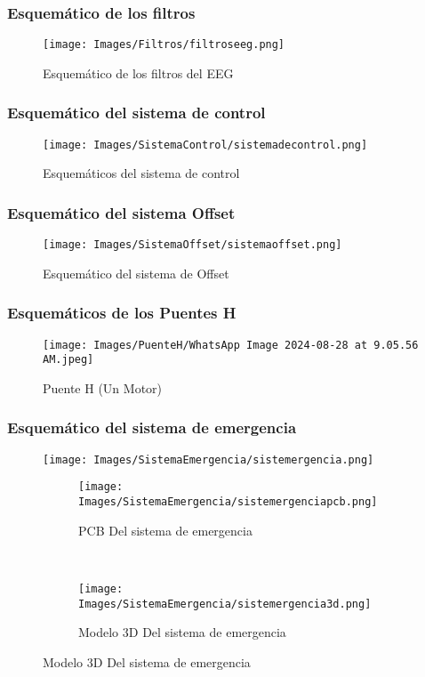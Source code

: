 \documentclass{article}
\begin{document}
\subsubsection{Esquemático de los filtros}
\begin{figure}[H]
    \centering
    \texttt{[image: Images/Filtros/filtroseeg.png]}
    \caption{Esquemático de los filtros del EEG}
\end{figure}

\subsubsection{Esquemático del sistema de control}
\begin{figure}[H]
    \centering
    \texttt{[image: Images/SistemaControl/sistemadecontrol.png]}
    \caption{Esquemáticos del sistema de control}
\end{figure}

\subsubsection{Esquemático del sistema Offset}
\begin{figure}[H]
    \centering
    \texttt{[image: Images/SistemaOffset/sistemaoffset.png]}
    \caption{Esquemático del sistema de Offset}
\end{figure}

\subsubsection{Esquemáticos de los Puentes H}
\begin{figure}[H]
    \centering
     \texttt{[image: Images/PuenteH/WhatsApp Image 2024-08-28 at 9.05.56 AM.jpeg]}
    \caption{Puente H (Un Motor)}
\end{figure}

\subsubsection{Esquemático del sistema de emergencia}
\begin{figure}[H]
    \centering
    \texttt{[image: Images/SistemaEmergencia/sistemergencia.png]}
    \caption{Esquemático del sistema de emegencia}


    \begin{subfigure}[t]{0.5\textwidth}
        \centering
        \texttt{[image: Images/SistemaEmergencia/sistemergenciapcb.png]}
        \caption{PCB Del sistema de emergencia}
    \end{subfigure}%
    ~ 
    \begin{subfigure}[t]{0.5\textwidth}
        \centering
        \texttt{[image: Images/SistemaEmergencia/sistemergencia3d.png]}
        \caption{Modelo 3D Del sistema de emergencia}
    \end{subfigure}

\end{figure}
\end{document}
